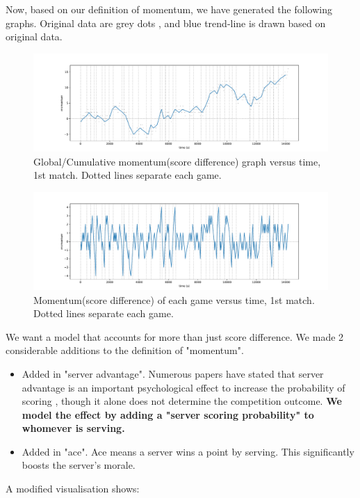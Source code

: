 \documentclass[UTF8]{mcmthesis}
\begin{document}
	Now, based on our definition of momentum, we have generated the following graphs. Original data are \color{gray} grey dots \color{black}, and \color{blue}blue trend-line \color{black}is drawn based on original data.
	
		
	\begin{figure}[H]
		\centering
		\includegraphics[width=1.0\linewidth]{figs/fig0_0.pdf}
		\caption{Global/Cumulative momentum(score difference) graph versus time, 1st match. Dotted lines separate each game. }
		\label{fig:fig0_0}
	\end{figure}	
	
	\begin{figure}[H]
		\centering
		\includegraphics[width=1.0\linewidth]{figs/fig1_0.pdf}
		\caption{Momentum(score difference) of each game versus time, 1st match. Dotted lines separate each game.}
		\label{fig:fig10}
	\end{figure}
	
	
	We want a model that accounts for more than just score difference. We made 2 considerable additions to the definition of "momentum". 
	\begin{itemize}
		\item Added in "server advantage". Numerous papers have stated that server advantage is an important psychological effect to increase the probability of scoring\cite{Klaassen_1999} \cite{MacPhee_Pollard_2004}, though it alone does not determine the competition outcome. \textbf{We model the effect by adding a "server scoring probability" to whomever is serving.}
		\item Added in "ace". Ace means a server wins a point by serving. This significantly boosts the server's morale. 
	\end{itemize} 
	A modified visualisation shows:
	
\end{document}
